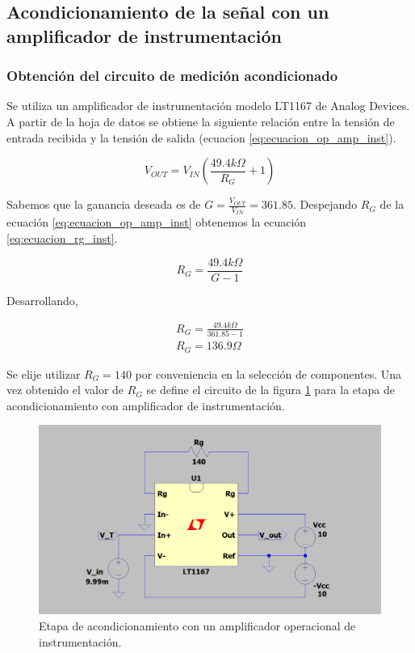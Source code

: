 \documentclass[journal,trans]{IEEEtran}
\begin{document}
\subsection{Acondicionamiento de la señal con un amplificador de instrumentación}

\subsubsection{Obtención del circuito de medición acondicionado}

Se utiliza un amplificador de instrumentación modelo LT1167 de Analog Devices. A partir de la hoja de datos se obtiene la siguiente relación entre la tensión de entrada recibida y la tensión de salida (ecuacion \ref{eq:ecuacion_op_amp_inst}).

\begin{equation} 
    \label {eq:ecuacion_op_amp_inst}
    V_{OUT} = V_{IN}(\frac{49.4k\Omega}{R_{G}}+1)
\end{equation}

Sabemos que la ganancia deseada es de $G=\frac{V_{OUT}}{V_{IN}}=361.85$. Despejando $R_{G}$ de la ecuación \ref{eq:ecuacion_op_amp_inst} obtenemos la ecuación \ref{eq:ecuacion_rg_inst}.

\begin{equation}
    \label {eq:ecuacion_rg_inst}
    R_{G} = \frac{49.4k\Omega}{G-1}
\end{equation}

Desarrollando,

\begin{gather*}
    R_{G} = \frac{49.4k\Omega}{361.85-1} \\
    R_{G} = 136.9 \Omega
\end{gather*}

Se elije utilizar $R_{G}=140$ por conveniencia en la selección de componentes. Una vez obtenido el valor de $R_{G}$ se define el circuito de la figura \ref{fig:op_amp_inst} para la etapa de acondicionamiento con amplificador de instrumentación.

\begin{figure}[hbtp]
	\centering
	\includegraphics[width = \columnwidth]{images/op_amp_inst.PNG}
	\caption{Etapa de acondicionamiento con un amplificador operacional de instrumentación.}
    \label{fig:op_amp_inst}
\end{figure}
\end{document}
